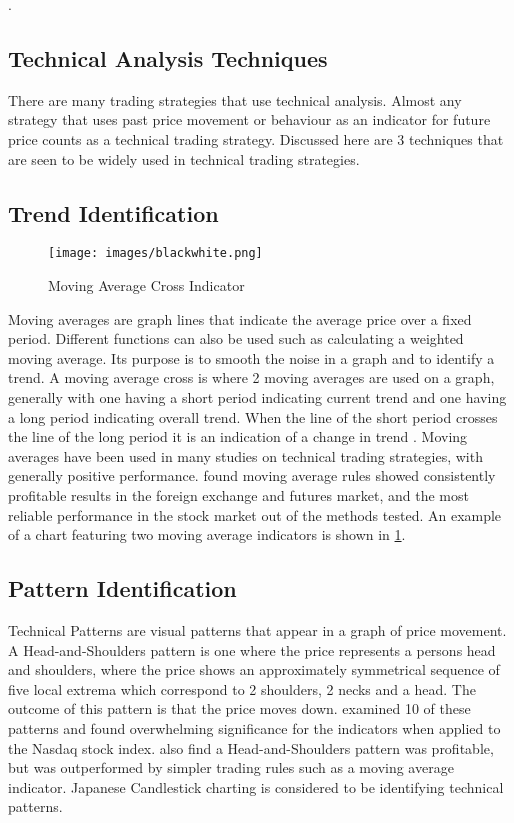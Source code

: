 \documentclass[12pt, oneside, a4paper]{article}
\theoremstyle{definition}
\begin{document}
.
\appendix
\begin{appendices}

\section{Technical Analysis Techniques}

\label{app:tatechniques}

There are many trading strategies that use technical analysis. Almost any strategy that uses past price movement or behaviour as an indicator for future price counts as a technical trading strategy. Discussed here are 3 techniques that are seen to be widely used in technical trading strategies.

\subsection{Trend Identification}

\begin{figure}[H]
    \centering
    \texttt{[image: images/blackwhite.png]}
    \caption{Moving Average Cross Indicator}
    \label{ma}
\end{figure}

Moving averages are graph lines that indicate the average price over a fixed period. Different functions can also be used such as calculating a weighted moving average. Its purpose is to smooth the noise in a graph and to identify a trend. A moving average cross is where 2 moving averages are used on a graph, generally with one having a short period indicating current trend and one having a long period indicating overall trend. When the line of the short period crosses the line of the long period it is an indication of a change in trend \citep{brock1992}. Moving averages have been used in many studies on technical trading strategies, with generally positive performance. \cite{taprofitability} found moving average rules showed consistently profitable results in the foreign exchange and futures market, and the most reliable performance in the stock market out of the methods tested. An example of a chart featuring two moving average indicators is shown in \cref{ma}.

\subsection{Pattern Identification}
Technical Patterns are visual patterns that appear in a graph of price movement. A Head-and-Shoulders pattern is one where the price represents a persons head and shoulders, where the price shows an approximately symmetrical sequence of five local extrema which correspond to 2 shoulders, 2 necks and a head. The outcome of this pattern is that the price moves down. \cite{foundations} examined 10 of these patterns and found overwhelming significance for the indicators when applied to the Nasdaq stock index. \cite{chang1999methodical} also find a Head-and-Shoulders pattern was profitable, but was outperformed by simpler trading rules such as a moving average indicator. Japanese Candlestick charting is considered to be identifying technical patterns.


\end{appendices}
\end{document}
